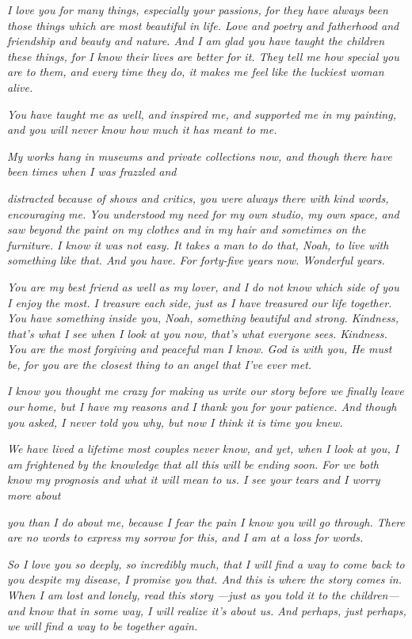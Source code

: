 \documentclass[10pt, twoside, openright]{book}
\begin{document}
\emph{I love you for many things, especially your passions, for they
have always been those things which are most beautiful in life. Love and
poetry and fatherhood and friendship and beauty and nature. And I am
glad you have taught the children these things, for I know their lives
are better for it. They tell me how special you are to them, and every
time they do, it makes me feel like the luckiest woman alive.}

\emph{You have taught me as well, and inspired me, and supported me in
my painting, and you will never know how much it has meant to me.}

\emph{My works hang in museums and private collections now, and though
there have been times when I was frazzled and}

\emph{distracted because of shows and critics, you were always there
with kind words, encouraging me. You understood my need for my own
studio, my own space, and saw beyond the paint on my clothes and in my
hair and sometimes on the furniture. I know it was not easy. It takes a
man to do that, Noah, to live with something like that. And you have.
For forty-five years now. Wonderful years.}

\emph{You are my best friend as well as my lover, and I do not know
which side of you I enjoy the most. I treasure each side, just as I have
treasured our life together. You have something inside you, Noah,
something beautiful and strong. Kindness, that's what I see when I look
at you now, that's what everyone sees. Kindness. You are the most
forgiving and peaceful man I know. God is with you, He must be, for you
are the closest thing to an angel that I've ever met.}

\emph{I know you thought me crazy for making us write our story before
we finally leave our home, but I have my reasons and I thank you for
your patience. And though you asked, I never told you why, but now I
think it is time you knew.}

\emph{We have lived a lifetime most couples never know, and yet, when I
look at you, I am frightened by the knowledge that all this will be
ending soon. For we both know my prognosis and what it will mean to us.
I see your tears and I worry more about}

\emph{you than I do about me, because I fear the pain I know you will go
through. There are no words to express my sorrow for this, and I am at a
loss for words.}

\emph{So I love you so deeply, so incredibly much, that I will find a
way to come back to you despite my disease, I promise you that. And this
is where the story comes in. When I am lost and lonely, read this story
---just as you told it to the children---and know that in some way, I
will realize it's about us. And perhaps, just perhaps, we will find a
way to be together again.}
\end{document}
